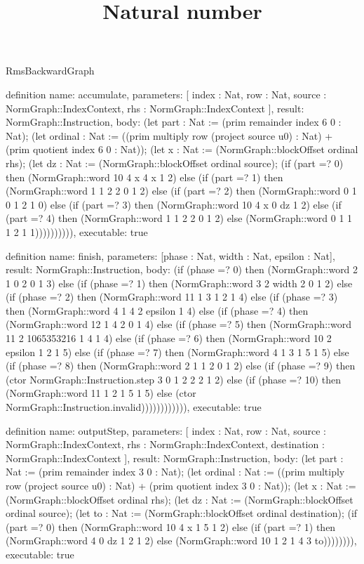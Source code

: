 \begin{lexlean}{RmsBackwardGraph}
\title{Natural number}
\begin{semanticmodule}
definition{
  name: accumulate,
  parameters: [
    index : Nat,
    row : Nat,
    source : NormGraph::IndexContext,
    rhs : NormGraph::IndexContext
  ],
  result: NormGraph::Instruction,
  body: (let part : Nat := (prim remainder index 6 0 : Nat); (let ordinal : Nat := ((prim multiply row (project source u0) : Nat) + (prim quotient index 6 0 : Nat)); (let x : Nat := (NormGraph::blockOffset ordinal rhs); (let dz : Nat := (NormGraph::blockOffset ordinal source); (if (part =? 0) then (NormGraph::word 10 4 x 4 x 1 2) else (if (part =? 1) then (NormGraph::word 1 1 2 2 0 1 2) else (if (part =? 2) then (NormGraph::word 0 1 0 1 2 1 0) else (if (part =? 3) then (NormGraph::word 10 4 x 0 dz 1 2) else (if (part =? 4) then (NormGraph::word 1 1 2 2 0 1 2) else (NormGraph::word 0 1 1 1 2 1 1)))))))))),
  executable: true
}

definition{
  name: finish,
  parameters: [phase : Nat, width : Nat, epsilon : Nat],
  result: NormGraph::Instruction,
  body: (if (phase =? 0) then (NormGraph::word 2 1 0 2 0 1 3) else (if (phase =? 1) then (NormGraph::word 3 2 width 2 0 1 2) else (if (phase =? 2) then (NormGraph::word 11 1 3 1 2 1 4) else (if (phase =? 3) then (NormGraph::word 4 1 4 2 epsilon 1 4) else (if (phase =? 4) then (NormGraph::word 12 1 4 2 0 1 4) else (if (phase =? 5) then (NormGraph::word 11 2 1065353216 1 4 1 4) else (if (phase =? 6) then (NormGraph::word 10 2 epsilon 1 2 1 5) else (if (phase =? 7) then (NormGraph::word 4 1 3 1 5 1 5) else (if (phase =? 8) then (NormGraph::word 2 1 1 2 0 1 2) else (if (phase =? 9) then (ctor NormGraph::Instruction.step 3 0 1 2 2 2 1 2) else (if (phase =? 10) then (NormGraph::word 11 1 2 1 5 1 5) else (ctor NormGraph::Instruction.invalid)))))))))))),
  executable: true
}

definition{
  name: outputStep,
  parameters: [
    index : Nat,
    row : Nat,
    source : NormGraph::IndexContext,
    rhs : NormGraph::IndexContext,
    destination : NormGraph::IndexContext
  ],
  result: NormGraph::Instruction,
  body: (let part : Nat := (prim remainder index 3 0 : Nat); (let ordinal : Nat := ((prim multiply row (project source u0) : Nat) + (prim quotient index 3 0 : Nat)); (let x : Nat := (NormGraph::blockOffset ordinal rhs); (let dz : Nat := (NormGraph::blockOffset ordinal source); (let to : Nat := (NormGraph::blockOffset ordinal destination); (if (part =? 0) then (NormGraph::word 10 4 x 1 5 1 2) else (if (part =? 1) then (NormGraph::word 4 0 dz 1 2 1 2) else (NormGraph::word 10 1 2 1 4 3 to)))))))),
  executable: true
}


\end{semanticmodule}
\end{lexlean}
